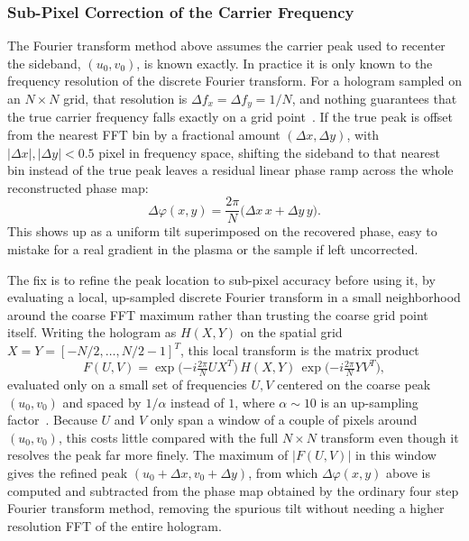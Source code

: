 \subsubsection{Sub-Pixel Correction of the Carrier Frequency}

The Fourier transform method above assumes the carrier peak used to recenter the sideband, $(u_0,v_0)$, is known exactly. In practice it is only known to the frequency resolution of the discrete Fourier transform. For a hologram sampled on an $N\times N$ grid, that resolution is $\Delta f_x=\Delta f_y=1/N$, and nothing guarantees that the true carrier frequency falls exactly on a grid point~\cite{khare2023fourier}. If the true peak is offset from the nearest FFT bin by a fractional amount $(\Delta x,\Delta y)$, with $|\Delta x|,|\Delta y|<0.5$ pixel in frequency space, shifting the sideband to that nearest bin instead of the true peak leaves a residual linear phase ramp across the whole reconstructed phase map:
\begin{equation}
\Delta\varphi(x,y) = \frac{2\pi}{N}\big(\Delta x\, x + \Delta y\, y\big).
\end{equation}
This shows up as a uniform tilt superimposed on the recovered phase, easy to mistake for a real gradient in the plasma or the sample if left uncorrected.

The fix is to refine the peak location to sub-pixel accuracy before using it, by evaluating a local, up-sampled discrete Fourier transform in a small neighborhood around the coarse FFT maximum rather than trusting the coarse grid point itself. Writing the hologram as $H(X,Y)$ on the spatial grid $X=Y=[-N/2,\dots,N/2-1]^T$, this local transform is the matrix product
\begin{equation}
F(U,V) = \exp\!\Big({-i\tfrac{2\pi}{N}UX^T}\Big)\,H(X,Y)\,\exp\!\Big({-i\tfrac{2\pi}{N}YV^T}\Big),
\end{equation}
evaluated only on a small set of frequencies $U,V$ centered on the coarse peak $(u_0,v_0)$ and spaced by $1/\alpha$ instead of $1$, where $\alpha\sim10$ is an up-sampling factor~\cite{khare2023fourier}. Because $U$ and $V$ only span a window of a couple of pixels around $(u_0,v_0)$, this costs little compared with the full $N\times N$ transform even though it resolves the peak far more finely. The maximum of $|F(U,V)|$ in this window gives the refined peak $(u_0+\Delta x, v_0+\Delta y)$, from which $\Delta\varphi(x,y)$ above is computed and subtracted from the phase map obtained by the ordinary four step Fourier transform method, removing the spurious tilt without needing a higher resolution FFT of the entire hologram.

